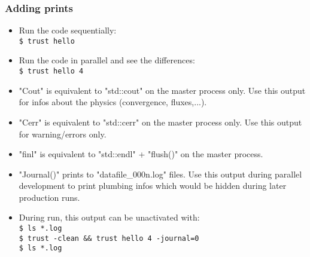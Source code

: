 \documentclass[10pt, hyperref={unicode=true,pdfusetitle, bookmarks=true,bookmarksnumbered=false,bookmarksopen=false, breaklinks=false,pdfborder={0 0 1},backref=true,colorlinks=true,linkcolor=darkblue,pageanchor, urlcolor=darkblue}]{beamer}
\begin{document}
\begin{frame}
\frametitle{Adding prints}
\begin{block}{}

\begin{itemize}
\item Run the code sequentially:\\
\texttt{\$ trust hello}

\item Run the code in parallel and see the differences:\\
\texttt{\$ trust hello 4}

\item "Cout" is equivalent to "std::cout" on the master process only.
Use this output for infos about the physics (convergence, fluxes,...).

\item "Cerr" is equivalent to "std::cerr" on the master process only.
Use this output for warning/errors only.

\item "finl" is equivalent to "std::endl" + "flush()" on the master process.

\item "Journal()" prints to "datafile\_000n.log" files.
Use this output during parallel development to print plumbing infos which would be hidden during later production runs.

\item During run, this output can be unactivated with:\\
\texttt{\$ ls *.log}\\
\texttt{\$ trust -clean \&\& trust hello 4 -journal=0}\\
\texttt{\$ ls *.log}\\
\end{itemize}

\end{block}
\end{frame}
\end{document}
